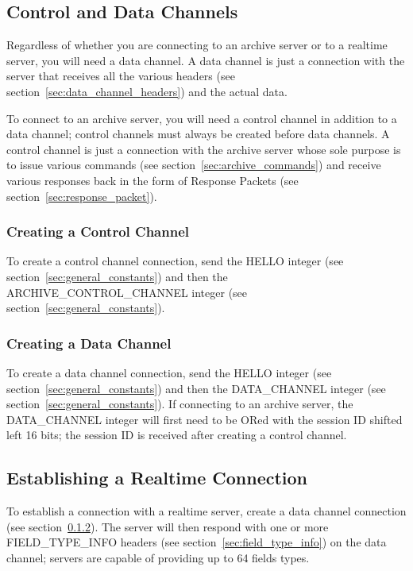 \documentclass[10pt]{article}
\begin{document}
\subsection{Control and Data Channels}
Regardless of whether you are connecting to an archive server or to a realtime server, you will need a data channel. A data channel is just a connection with the server that receives all the various headers (see section~\ref{sec:data_channel_headers}) and the actual data.

To connect to an archive server, you will need a control channel in addition to a data channel; control channels must always be created before data channels. A control channel is just a connection with the archive server whose sole purpose is to issue various commands (see section~\ref{sec:archive_commands}) and receive various responses back in the form of Response Packets (see section~\ref{sec:response_packet}).

\subsubsection{Creating a Control Channel}
\label{sec:create_control_channel}
To create a control channel connection, send the HELLO integer (see section~\ref{sec:general_constants}) and then the ARCHIVE\_CONTROL\_CHANNEL integer (see section~\ref{sec:general_constants}).

\subsubsection{Creating a Data Channel}
\label{sec:create_data_channel}
To create a data channel connection, send the HELLO integer (see section~\ref{sec:general_constants}) and then the DATA\_CHANNEL integer (see section~\ref{sec:general_constants}). If connecting to an archive server, the DATA\_CHANNEL integer will first need to be ORed with the session ID shifted left 16 bits; the session ID is received after creating a control channel.

\subsection{Establishing a Realtime Connection}
To establish a connection with a realtime server, create a data channel connection (see section~\ref{sec:create_data_channel}). The server will then respond with one or more FIELD\_TYPE\_INFO headers (see section~\ref{sec:field_type_info}) on the data channel; servers are capable of providing up to 64 fields types.
\end{document}

